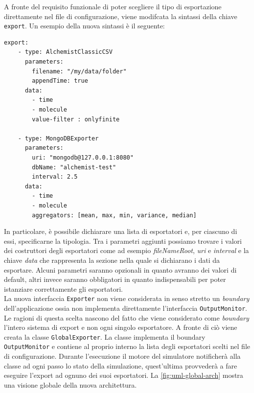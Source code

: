 \documentclass[12pt,a4paper,openright,oneside]{book}
\begin{document}
A fronte del requisito funzionale di poter scegliere il tipo di esportazione direttamente nel file di configurazione, viene modifcata la sintassi della chiave \texttt{export}.
Un esempio della nuova sintassi è il seguente:\\
 \begin{verbatim}
export:
    - type: AlchemistClassicCSV
      parameters: 
        filename: "/my/data/folder"
        appendTime: true
      data:
        - time
        - molecule
        value-filter : onlyfinite

    - type: MongoDBExporter
      parameters: 
        uri: "mongodb@127.0.0.1:8080"
        dbName: "alchemist-test"
        interval: 2.5
      data:
        - time
        - molecule
        aggregators: [mean, max, min, variance, median]
\end{verbatim}
In particolare, è possibile dichiarare una lista di esportatori e, per ciascuno di essi, specificarne la tipologia.
Tra i parametri aggiunti possiamo trovare i valori dei costruttori degli esportatori come ad esempio \textit{fileNameRoot}, \textit{uri} e \textit{interval} e la chiave \textit{data} che rappresenta la sezione nella quale si dichiarano i dati da esportare. Alcuni parametri saranno opzionali in quanto avranno dei valori di default, altri invece saranno obbligatori in quanto indispensabili per poter istanziare correttamente gli esportatori.\\
La nuova interfaccia \texttt{Exporter} non viene considerata in senso stretto un \textit{boundary} dell'applicazione ossia non implementa direttamente l'interfaccia \texttt{OutputMonitor}. Le ragioni di questa scelta nascono del fatto che viene considerato come \textit{boundary} l'intero sistema di export e non ogni singolo esportatore. A fronte di ciò viene creata la classe \texttt{GlobalExporter}.
La classe implementa il boundary \texttt{OutputMonitor} e contiene al proprio interno la lista degli esportatori scelti nel file di configurazione.
Durante l'esecuzione il motore del simulatore notificherà alla classe ad ogni passo lo stato della simulazione, quest'ultima provvederà a fare eseguire l'export ad ognuno dei suoi esportatori.
La \cref{fig:uml-global-arch} mostra una visione globale della nuova architettura.
\end{document}
